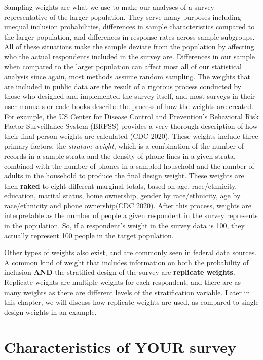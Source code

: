 \documentclass[
  letterpaper,
  DIV=11,
  numbers=noendperiod]{scrreprt}
\begin{document}
Sampling weights are what we use to make our analyses of a survey
representative of the larger population. They serve many purposes
including unequal inclusion probabilities, differences in sample
characteristics compared to the larger population, and differences in
response rates across sample subgroups. All of these situations make the
sample deviate from the population by affecting who the actual
respondents included in the survey are. Differences in our sample when
compared to the larger population can affect most all of our statistical
analysis since again, most methods assume random sampling. The weights
that are included in public data are the result of a rigorous process
conducted by those who designed and implemented the survey itself, and
most surveys in their user manuals or code books describe the process of
how the weights are created. For example, the US Center for Disease
Control and Prevention's Behavioral Risk Factor Surveillance System
(BRFSS) provides a very thorough description of how their final person
weights are calculated (CDC 2020). These weights include three primary
factors, the \emph{stratum weight}, which is a combination of the number
of records in a sample strata and the density of phone lines in a given
strata, combined with the number of phones in a sampled household and
the number of adults in the household to produce the final design
weight. These weights are then \textbf{raked} to eight different
marginal totals, based on age, race/ethnicity, education, marital
status, home ownership, gender by race/ethnicity, age by race/ethnicity
and phone ownership(CDC 2020). After this process, weights are
interpretable as the number of people a given respondent in the survey
represents in the population. So, if a respondent's weight in the survey
data is 100, they actually represent 100 people in the target
population.

Other types of weights also exist, and are commonly seen in federal data
sources. A common kind of weight that includes information on both the
probability of inclusion \textbf{AND} the stratified design of the
survey are \textbf{replicate weights}. Replicate weights are multiple
weights for each respondent, and there are as many weights as there are
different levels of the stratification variable. Later in this chapter,
we will discuss how replicate weights are used, as compared to single
design weights in an example.

\hypertarget{characteristics-of-your-survey}{%
\section{Characteristics of YOUR
survey}\label{characteristics-of-your-survey}}
\end{document}
